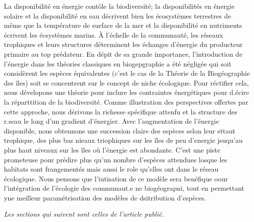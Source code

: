 La disponibilité en énergie contôle la biodiversité; la disponibilités en
énergie solaire et la disponibilité en eau décrivent bien les écosystèmes
terrestres de même que la température de surface de la mer et la disponibilité
en nutriments écrivent les écsystèmes marins. À l'échelle de la communauté,
les réseaux trophiques et leurs structures déterminent les échanges d'énergie
du producteur primaire au top prédateur. En dépit de sa grande importance,
l'introduction de l'énergie dans les théories classiques en biogepgraphie a été
négligée qui soit considèrent les espèces équivalentes (c'est le cas de la
Théorie de la Biogéographie des îles) soit se concentrent sur le concept de niche
écologique. Pour réctifier cela, nous dévelopons une théorie pour inclure
les contraintes énergétiques pour d.écire la réparttition de la biodiversité.
Comme illustration des perspectives offertes par cette approche, nous dérivons
la richesse spécifique attenfu et la structure des r.seau le long d'un gradient
d'énergier. Avec l'augmentation de l'énergie disponible, nous obtennons une succession claire
des espèces selon leur sttaut trophique, des plus bas nieaux triophiques sur
les îles de peu d'energie jsuqu'au plus haut niveaux sur les îles où l'énergie
est abondante. C'est une piste prometeuse pour prédire plus qu'un nombre
d'espèces attendues losque les habitats sont frangementés mais aussi le role qu'elles
ont dans le réseau écologique. Nous pensons que l'iutisation de ce modèle
sera benéfique oour l'intégration de l'écologie des communaut.e ne biogéograpni,
tout en permettant yne meilleur paramétrisation des modèles de dsitribution
d'espèces.





\emph{Les sections qui suivent sont celles de l'article publié.}
